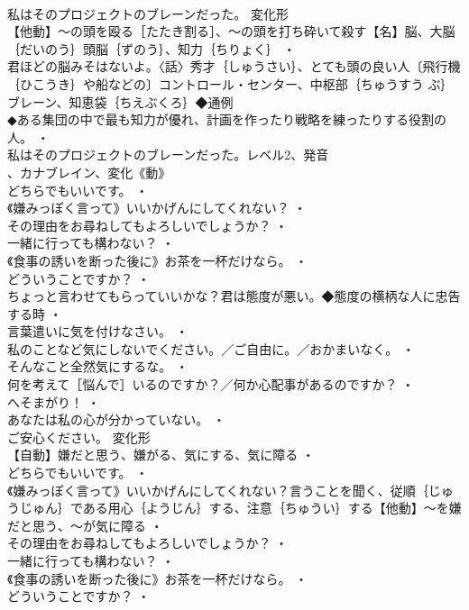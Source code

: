 \documentclass[8pt]{extreport}
\begin{document}
\begin{CJK}{UTF8}{min}
\\	私はそのプロジェクトのブレーンだった。	変化形 
\\	【他動】～の頭を殴る［たたき割る］、～の頭を打ち砕いて殺す【名】脳、大脳｛だいのう｝頭脳｛ずのう｝、知力｛ちりょく｝ ・
\\	君ほどの脳みそはないよ。〈話〉秀才｛しゅうさい｝、とても頭の良い人〔飛行機｛ひこうき｝や船などの〕コントロール・センター、中枢部｛ちゅうすう ぶ｝ブレーン、知恵袋｛ちえぶくろ｝◆通例
\\	◆ある集団の中で最も知力が優れ、計画を作ったり戦略を練ったりする役割の人。 ・
\\	私はそのプロジェクトのブレーンだった。レベル2、発音
\\	、カナブレイン、変化《動》
\\	どちらでもいいです。 ・
\\	《嫌みっぽく言って》いいかげんにしてくれない？ ・
\\	その理由をお尋ねしてもよろしいでしょうか？ ・
\\	一緒に行っても構わない？ ・
\\	《食事の誘いを断った後に》お茶を一杯だけなら。 ・
\\	どういうことですか？ ・
\\	ちょっと言わせてもらっていいかな？君は態度が悪い。◆態度の横柄な人に忠告する時 ・
\\	言葉遣いに気を付けなさい。 ・
\\	私のことなど気にしないでください。／ご自由に。／おかまいなく。 ・
\\	そんなこと全然気にするな。 ・
\\	何を考えて［悩んで］いるのですか？／何か心配事があるのですか？ ・
\\	へそまがり！ ・
\\	あなたは私の心が分かっていない。 ・
\\	ご安心ください。	変化形 
\\	【自動】嫌だと思う、嫌がる、気にする、気に障る ・
\\	どちらでもいいです。 ・
\\	《嫌みっぽく言って》いいかげんにしてくれない？言うことを聞く、従順｛じゅうじゅん｝である用心｛ようじん｝する、注意｛ちゅうい｝する【他動】～を嫌だと思う、～が気に障る ・
\\	その理由をお尋ねしてもよろしいでしょうか？ ・
\\	一緒に行っても構わない？ ・
\\	《食事の誘いを断った後に》お茶を一杯だけなら。 ・
\\	どういうことですか？ ・

\end{CJK}
\end{document}
